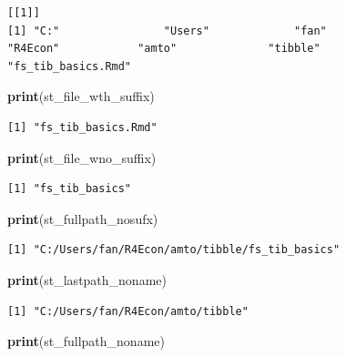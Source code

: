 \documentclass[
]{book}
\newenvironment{Shaded}{\begin{snugshade}}{\end{snugshade}}
\newcommand{\KeywordTok}[1]{\textcolor[rgb]{0.13,0.29,0.53}{\textbf{#1}}}
\newcommand{\NormalTok}[1]{#1}
\begin{document}
\begin{verbatim}
[[1]]
[1] "C:"                "Users"             "fan"               "R4Econ"            "amto"              "tibble"            "fs_tib_basics.Rmd"
\end{verbatim}

\begin{Shaded}
\begin{Highlighting}[]
\KeywordTok{print}\NormalTok{(st_file_wth_suffix)}
\end{Highlighting}
\end{Shaded}

\begin{verbatim}
[1] "fs_tib_basics.Rmd"
\end{verbatim}

\begin{Shaded}
\begin{Highlighting}[]
\KeywordTok{print}\NormalTok{(st_file_wno_suffix)}
\end{Highlighting}
\end{Shaded}

\begin{verbatim}
[1] "fs_tib_basics"
\end{verbatim}

\begin{Shaded}
\begin{Highlighting}[]
\KeywordTok{print}\NormalTok{(st_fullpath_nosufx)}
\end{Highlighting}
\end{Shaded}

\begin{verbatim}
[1] "C:/Users/fan/R4Econ/amto/tibble/fs_tib_basics"
\end{verbatim}

\begin{Shaded}
\begin{Highlighting}[]
\KeywordTok{print}\NormalTok{(st_lastpath_noname)}
\end{Highlighting}
\end{Shaded}

\begin{verbatim}
[1] "C:/Users/fan/R4Econ/amto/tibble"
\end{verbatim}

\begin{Shaded}
\begin{Highlighting}[]
\KeywordTok{print}\NormalTok{(st_fullpath_noname)}
\end{Highlighting}
\end{Shaded}
\end{document}
